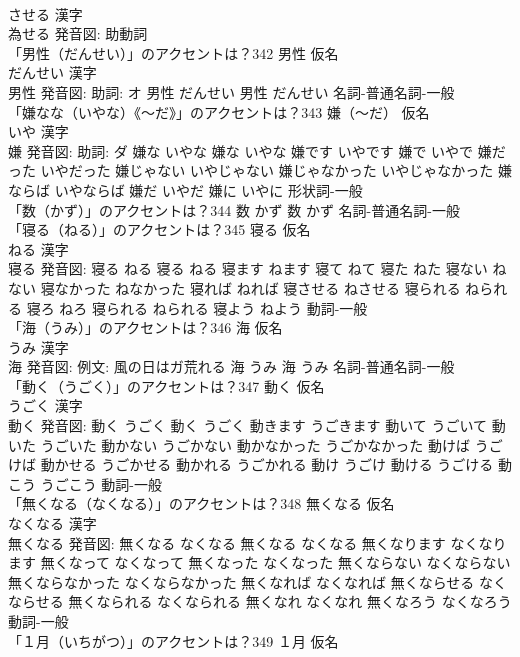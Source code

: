 \documentclass[8pt]{extreport}
\begin{document}
\begin{CJK}{UTF8}{min}
\\	させる 漢字　
\\	為せる 発音図:							助動詞 
\\	「男性（だんせい）」のアクセントは？342	男性 仮名　
\\	だんせい 漢字　
\\	男性 発音図: 助詞: オ	男性 だんせい		男性 だんせい				名詞-普通名詞-一般 
\\	「嫌なな（いやな）《〜だ》」のアクセントは？343	嫌（〜だ） 仮名　
\\	いや 漢字　
\\	嫌 発音図: 助詞: ダ	嫌な いやな		嫌な いやな 嫌です いやです 嫌で いやで 嫌だった いやだった 嫌じゃない いやじゃない 嫌じゃなかった いやじゃなかった 嫌ならば いやならば 嫌だ いやだ 嫌に いやに				形状詞-一般 
\\	「数（かず）」のアクセントは？344		数 かず		数 かず				名詞-普通名詞-一般 
\\	「寝る（ねる）」のアクセントは？345	寝る 仮名　
\\	ねる 漢字　
\\	寝る 発音図:	寝る ねる		寝る ねる 寝ます ねます 寝て ねて 寝た ねた 寝ない ねない 寝なかった ねなかった 寝れば ねれば 寝させる ねさせる 寝られる ねられる 寝ろ ねろ 寝られる ねられる 寝よう ねよう				動詞-一般 
\\	「海（うみ）」のアクセントは？346	海 仮名　
\\	うみ 漢字　
\\	海 発音図: 例文: 風の日はガ荒れる	海 うみ		海 うみ				名詞-普通名詞-一般 
\\	「動く（うごく）」のアクセントは？347	動く 仮名　
\\	うごく 漢字　
\\	動く 発音図:	動く うごく		動く うごく 動きます うごきます 動いて うごいて 動いた うごいた 動かない うごかない 動かなかった うごかなかった 動けば うごけば 動かせる うごかせる 動かれる うごかれる 動け うごけ 動ける うごける 動こう うごこう				動詞-一般 
\\	「無くなる（なくなる）」のアクセントは？348	無くなる 仮名　
\\	なくなる 漢字　
\\	無くなる 発音図:	無くなる なくなる		無くなる なくなる 無くなります なくなります 無くなって なくなって 無くなった なくなった 無くならない なくならない 無くならなかった なくならなかった 無くなれば なくなれば 無くならせる なくならせる 無くなられる なくなられる 無くなれ なくなれ 無くなろう なくなろう				動詞-一般 
\\	「１月（いちがつ）」のアクセントは？349	１月 仮名　

\end{CJK}
\end{document}

